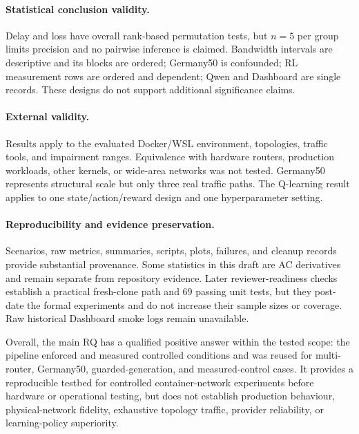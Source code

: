\paragraph{Statistical conclusion validity.} Delay and loss have overall rank-based permutation tests, but $n=5$ per group limits precision and no pairwise inference is claimed. Bandwidth intervals are descriptive and its blocks are ordered; Germany50 is confounded; RL measurement rows are ordered and dependent; Qwen and Dashboard are single records. These designs do not support additional significance claims.

\paragraph{External validity.} Results apply to the evaluated Docker/WSL environment, topologies, traffic tools, and impairment ranges. Equivalence with hardware routers, production workloads, other kernels, or wide-area networks was not tested. Germany50 represents structural scale but only three real traffic paths. The Q-learning result applies to one state/action/reward design and one hyperparameter setting.

\paragraph{Reproducibility and evidence preservation.} Scenarios, raw metrics, summaries, scripts, plots, failures, and cleanup records provide substantial provenance. Some statistics in this draft are AC derivatives and remain separate from repository evidence. Later reviewer-readiness checks establish a practical fresh-clone path and 69 passing unit tests, but they post-date the formal experiments and do not increase their sample sizes or coverage. Raw historical Dashboard smoke logs remain unavailable.

Overall, the main RQ has a qualified positive answer within the tested scope: the pipeline enforced and measured controlled conditions and was reused for multi-router, Germany50, guarded-generation, and measured-control cases. It provides a reproducible testbed for controlled container-network experiments before hardware or operational testing, but does not establish production behaviour, physical-network fidelity, exhaustive topology traffic, provider reliability, or learning-policy superiority.
